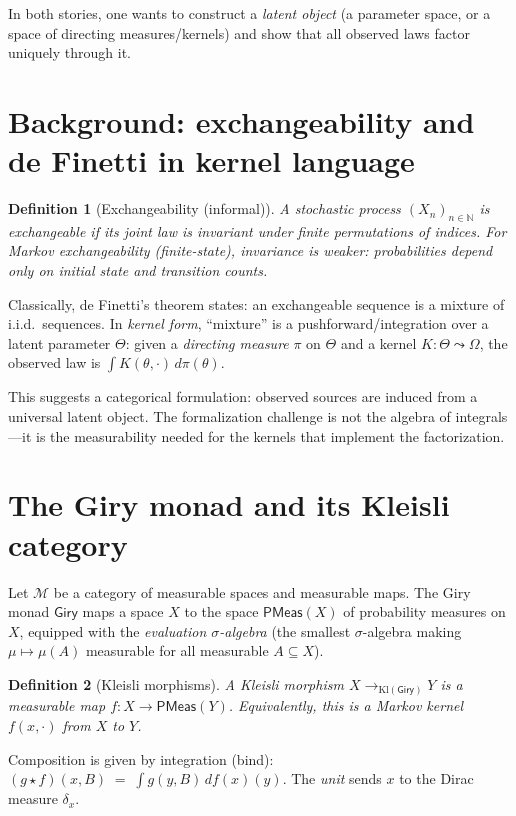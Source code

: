 \documentclass[11pt]{article}
\newtheorem{definition}{Definition}
\newcommand{\NN}{\mathbb{N}}
\newcommand{\ProbMeas}{\mathsf{PMeas}}
\newcommand{\Giry}{\mathsf{Giry}}
\begin{document}
In both stories, one wants to construct a \emph{latent object} (a parameter space, or a space of
directing measures/kernels) and show that all observed laws factor uniquely through it.

\section{Background: exchangeability and de Finetti in kernel language}

\begin{definition}[Exchangeability (informal)]
A stochastic process $(X_n)_{n\in\NN}$ is \emph{exchangeable} if its joint law is invariant under
finite permutations of indices. For Markov exchangeability (finite-state), invariance is weaker:
probabilities depend only on initial state and transition counts.
\end{definition}

Classically, de Finetti's theorem states: an exchangeable sequence is a mixture of i.i.d.\ sequences.
In \emph{kernel form}, ``mixture'' is a pushforward/integration over a latent parameter $\Theta$:
given a \emph{directing measure} $\pi$ on $\Theta$ and a kernel $K : \Theta \leadsto \Omega$,
the observed law is $\int K(\theta,\cdot)\,d\pi(\theta)$.

This suggests a categorical formulation: observed sources are induced from a universal latent object.
The formalization challenge is not the algebra of integrals---it is the measurability needed for the
kernels that implement the factorization.

\section{The Giry monad and its Kleisli category}

Let $\mathcal{M}$ be a category of measurable spaces and measurable maps. The Giry monad $\Giry$
maps a space $X$ to the space $\ProbMeas(X)$ of probability measures on $X$, equipped with the
\emph{evaluation $\sigma$-algebra} (the smallest $\sigma$-algebra making $\mu\mapsto \mu(A)$ measurable
for all measurable $A\subseteq X$).

\begin{definition}[Kleisli morphisms]
A Kleisli morphism $X \to_{\mathrm{Kl}(\Giry)} Y$ is a measurable map
$f : X \to \ProbMeas(Y)$.
Equivalently, this is a Markov kernel $f(x,\cdot)$ from $X$ to $Y$.
\end{definition}

Composition is given by integration (bind):
$(g \star f)(x, B) \;=\; \int g(y,B)\,df(x)(y)$.
The \emph{unit} sends $x$ to the Dirac measure $\delta_x$.
\end{document}
